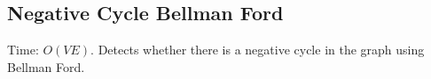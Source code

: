 \subsection{Negative Cycle Bellman Ford}

Time: $O(VE)$.
Detects whether there is a negative cycle in the graph using Bellman Ford.